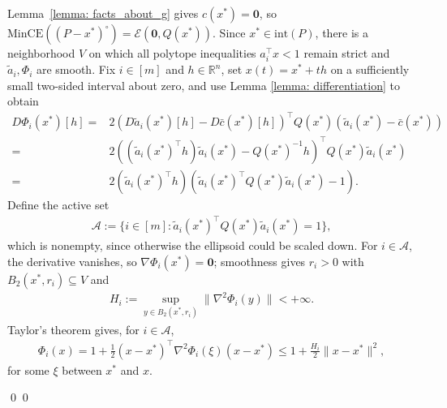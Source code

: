 \documentclass[smallextended]{svjour3}
\let\springerproof\proof
\let\endspringerproof\endproof
\renewenvironment{proof}{\springerproof}{%
  \ifhmode\qed\else\leavevmode\qed\fi\endspringerproof}
\newcommand{\R}{\mathbb{R}}
\newcommand{\E}{\mathcal{E}}
\begin{document}
\begin{proof}
    Lemma~\ref{lemma: facts_about_g} gives $c(x^*)=\mathbf0$, so
    $\mathrm{MinCE}((P-x^*)^\circ)=\E(\mathbf0,Q(x^*))$. Since
    $x^*\in\mathrm{int}(P)$, there is a neighborhood $V$ on which all
    polytope inequalities $a_i^\top x<1$ remain strict and
    $\tilde a_i,\Phi_i$ are smooth. Fix $i\in[m]$
    and $h\in\R^n$, set $x(t)=x^*+th$ on a sufficiently small two-sided
    interval about zero, and use Lemma
    \ref{lemma: differentiation} to obtain
    \begin{align*}
        D\Phi_i(x^*)[h] = & 2 (D\tilde{a}_i(x^*)[h] - D\bar{c}(x^*)[h])^\top Q(x^*)(\tilde{a}_i(x^*) - \bar{c}(x^*)) \\
        = & 2 ( (\tilde{a}_i(x^*)^\top h)\tilde{a}_i(x^*) - Q(x^*)^{-1}h)^\top Q(x^*) \tilde{a}_i(x^*) \\
        = & 2(\tilde{a}_i(x^*)^\top h)(\tilde{a}_i(x^*)^\top Q(x^*)\tilde{a}_i(x^*) - 1).
    \end{align*}
    Define the active set
    \begin{align*}
        \mathcal{A} := \{i\in[m]: \tilde{a}_i(x^*)^\top Q(x^*)\tilde{a}_i(x^*) = 1\},
    \end{align*}
    which is nonempty, since otherwise the ellipsoid could be scaled down. For
    $i\in\mathcal A$, the derivative vanishes, so
    $\nabla\Phi_i(x^*)=\mathbf{0}$; smoothness gives $r_i>0$ with
    $B_2(x^*,r_i)\subseteq V$ and
    \begin{align*}
        H_i := \sup_{y \in B_2(x^*, r_i)} \|\nabla^2\Phi_i(y)\| < +\infty.
    \end{align*}
    Taylor's theorem gives, for $i\in\mathcal A$,
    \begin{align*}
        \Phi_i(x)
        =
        1 + \frac{1}{2}(x-x^*)^\top \nabla^2\Phi_i(\xi)(x-x^*)
        \leq 1 + \frac{H_i}{2}\|x-x^*\|^2,
    \end{align*}
    for some $\xi$ between $x^*$ and $x$.


\end{proof}
\end{document}
